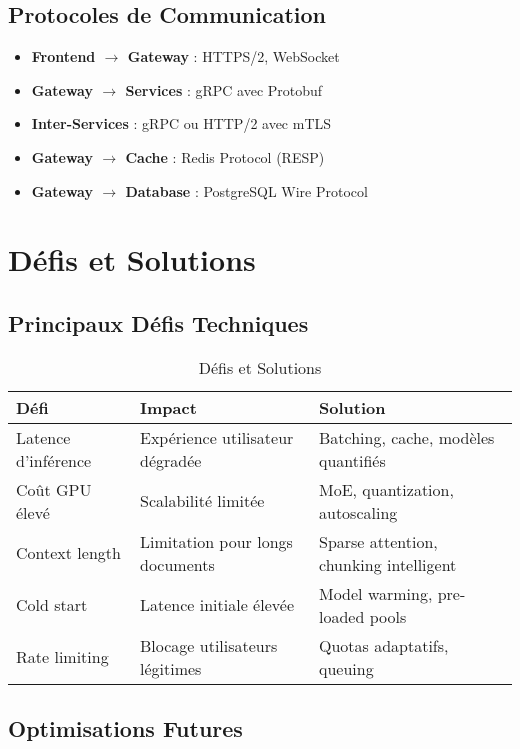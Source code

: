 \documentclass[12pt,a4paper]{article}
\begin{document}
\subsection{Protocoles de Communication}

\begin{itemize}[leftmargin=2cm]
    \item \textbf{Frontend $\rightarrow$ Gateway} : HTTPS/2, WebSocket
    \item \textbf{Gateway $\rightarrow$ Services} : gRPC avec Protobuf
    \item \textbf{Inter-Services} : gRPC ou HTTP/2 avec mTLS
    \item \textbf{Gateway $\rightarrow$ Cache} : Redis Protocol (RESP)
    \item \textbf{Gateway $\rightarrow$ Database} : PostgreSQL Wire Protocol
\end{itemize}

\newpage
\section{Défis et Solutions}

\subsection{Principaux Défis Techniques}

\begin{table}[h]
\centering
\small
\begin{tabular}{|p{4cm}|p{5cm}|p{5cm}|}
\hline
\textbf{Défi} & \textbf{Impact} & \textbf{Solution} \\
\hline
Latence d'inférence & Expérience utilisateur dégradée & Batching, cache, modèles quantifiés \\
\hline
Coût GPU élevé & Scalabilité limitée & MoE, quantization, autoscaling \\
\hline
Context length & Limitation pour longs documents & Sparse attention, chunking intelligent \\
\hline
Cold start & Latence initiale élevée & Model warming, pre-loaded pools \\
\hline
Rate limiting & Blocage utilisateurs légitimes & Quotas adaptatifs, queuing \\
\hline
\end{tabular}
\caption{Défis et Solutions}
\end{table}

\subsection{Optimisations Futures}
\end{document}
